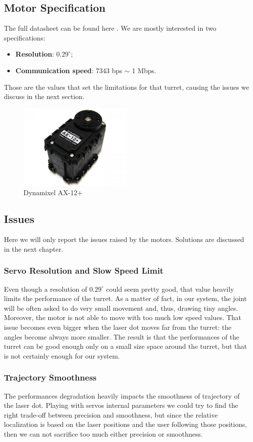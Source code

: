 \subsection{Motor Specification}
The full datasheet can be found here \cite{datasheet-AX-12}. We are mostly interested in two specifications: 
\begin{itemize}
    \item \textbf{Resolution}: $0.29^{\circ}$;
    \item \textbf{Communication speed}: 7343 bps $\sim$ 1 Mbps.
\end{itemize}
Those are the values that set the limitations for that turret, causing the issues we discuss in the next section.
\begin{figure}
	\centering
	\includegraphics[width=0.5\textwidth]{img/ax12+.jpg}%
	\caption{Dynamixel AX-12+}
	\label{fig:ax12+}
\end{figure}
\subsection{Issues}\label{subs:firstModel:issues}
Here we will only report the issues raised by the motors. Solutions are discussed in the next chapter.
\subsubsection{Servo Resolution and Slow Speed Limit}
Even though a resolution of $0.29^{\circ}$ could seem pretty good, that value heavily limits the performance of the turret. As a matter of fact, in our system, the joint will be often asked to do very small movement and, thus, drawing tiny angles. Moreover, the motor is not able to move with too much low speed values. That issue becomes even bigger when the laser dot moves far from the turret: the angles become always more smaller. The result is that the performances of the turret can be good enough only on a small size space around the turret, but that is not certainly enough for our system.
\subsubsection{Trajectory Smoothness}
The performances degradation heavily impacts the smoothness of trajectory of the laser dot. Playing with servos internal parameters we could try to find the right trade-off between precision and smoothness, but since the relative localization is based on the laser positions and the user following those positions, then we can not sacrifice too much either precision or smoothness.
